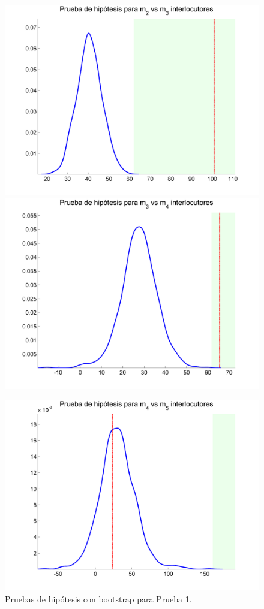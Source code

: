 \begin{figure}[bth]
  \centerline  
  {\includegraphics[width=0.8\linewidth]{gfx/chap6/caldb1}
   \includegraphics[width=0.8\linewidth]{gfx/chap6/caldb2} }
  \centerline  
  {\includegraphics[width=0.8\linewidth]{gfx/chap6/caldb3}
  } \quad
  \caption{Pruebas de hipótesis con bootstrap para Prueba 1.}
  \label{fig:prb1_boot}
\end{figure}


